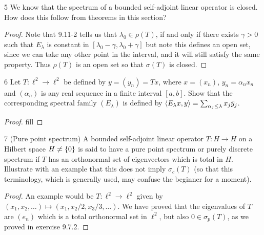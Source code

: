 \begin{exercise}{5}
We know that the spectrum of a bounded self-adjoint linear operator is closed.
How does this follow from theorems in this section?
\end{exercise}
\begin{proof}
Note that 9.11-2 tells us that $\lambda_0 \in \rho(T)$, if and only if there exists $\gamma > 0$ such that $E_\lambda$ is constant in $[\lambda_0 - \gamma, \lambda_0 + \gamma]$ but note this defines an open set, since we can take any other point in the interval, and it will still satisfy the same property.
Thus $\rho(T)$ is an open set so that $\sigma(T)$ is closed.
\end{proof} 

\begin{exercise}{6}
Let $T: \ell^2 \to \ell^2$ be defined by $y = (y_n) = Tx$, where $x = (x_n)$, $y_n = \alpha_n x_n$ and $(\alpha_n)$ is any real sequence in a finite interval $[a, b]$.
Show that the corresponding spectral family $(E_\lambda)$ is defined by $\langle E_\lambda x, y\rangle = \sum_{\alpha_j \leq \lambda} x_j \bar{y}_j$.
\end{exercise}
\begin{proof}
fill
\end{proof} 

\begin{exercise}{7 (Pure point spectrum)}
A bounded self-adjoint linear operator $T: H \to H$ on a Hilbert space $H \neq \{0\}$ is said to have a pure point spectrum or purely discrete spectrum if $T$ has an orthonormal set of eigenvectors which is total in $H$.
Illustrate with an example that this does not imply $\sigma_c(T)$ (so that this terminology, which is generally used, may confuse the beginner for a moment).
\end{exercise}
\begin{proof}
An example would be $T: \ell^2 \to \ell^2$ given by $(x_1, x_2, \dots) \mapsto (x_1, x_2/2, x_3/3, \dots)$.
We have proved that the eigenvalues of $T$ are $(e_n)$ which is a total orthonormal set in $\ell^2$, but also $0 \in \sigma_p(T)$, as we proved in exercise 9.7.2.
\end{proof} 

